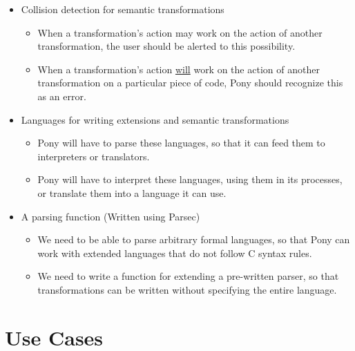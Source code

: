 \documentclass[11pt]{article}
\begin{document}
\begin{itemize}
\item Collision detection for semantic transformations
\begin{itemize}
\item When a transformation's action may work on the action of another transformation, the user should be alerted to this possibility.
\item When a transformation's action \underline{will} work on the action of another transformation on a particular piece of code, Pony should recognize this as an error.
\end{itemize}
\item Languages for writing extensions and semantic transformations
\begin{itemize}
\item Pony will have to parse these languages, so that it can feed them to interpreters or translators.
\item Pony will have to interpret these languages, using them in its processes, or translate them into a language it can use.
\end{itemize}
\item A parsing function (Written using Parsec)
\begin{itemize}
\item We need to be able to parse arbitrary formal languages, so that Pony can work with extended languages that do not follow C syntax rules.
\item We need to write a function for extending a pre-written parser, so that transformations can be written without specifying the entire language.
\end{itemize}
\end{itemize}
\section{Use Cases}
\label{sec-4}
\end{document}
